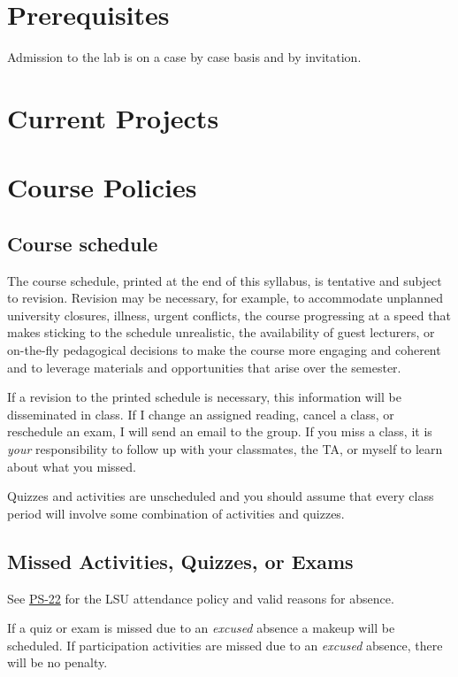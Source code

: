 \documentclass[11pt]{article}
\begin{document}
\section*{Prerequisites}
Admission to the lab is on a case by case basis and by invitation.


\section*{Current Projects}

\section*{Course Policies}

\subsection*{Course schedule}

The course schedule, printed at the end of this syllabus, is tentative and subject to revision.
Revision may be necessary, for example, to accommodate unplanned university closures, illness, urgent conflicts, the course progressing at a speed that makes sticking to the schedule unrealistic, the availability of guest lecturers, or on-the-fly pedagogical decisions to make the course more engaging and coherent and to leverage materials and opportunities that arise over the semester.

If a revision to the printed schedule is necessary, this information will be disseminated in class.
If I change an assigned reading, cancel a class, or reschedule an exam, I will send an email to the group.
If you miss a class, it is \emph{your} responsibility to follow up with your classmates, the TA, or myself to learn about what you missed.

Quizzes and activities are unscheduled and you should assume that every class period will involve some combination of activities and quizzes.


\subsection*{Missed Activities, Quizzes, or Exams}
See \href{https://sites01.lsu.edu/wp/policiesprocedures/policies-procedures/22/}{PS-22} for the LSU attendance policy and valid reasons for absence.

If a quiz or exam is missed due to an \emph{excused} absence a makeup will be scheduled.
If participation activities are missed due to an \emph{excused} absence, there will be no penalty.
\end{document}
